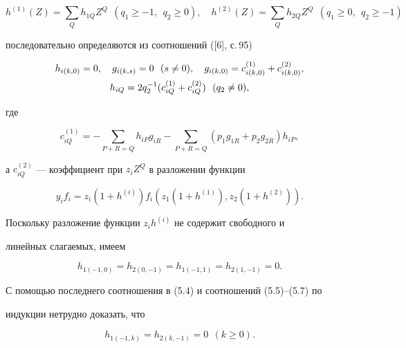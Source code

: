 $$ 


h^{(1)}(Z)=\sum_Q h_{1Q}Z^Q\ \ (q_1\ge-1,\ \ q_2\ge0),\quad 


h^{(2)}(Z)=\sum_Q h_{2Q}Z^Q\ \ (q_1\ge0,\ \ q_2\ge-1) 


$$ 


последовательно определяются из соотношений ([6], с.\,95) 


\begin{gather} 


h_{i(k,0)}=0,\quad g_{i(k,s)}=0\ \ (s\ne0),\quad 


g_{i(k,0)}=c^{(1)}_{i(k,0)}+c^{(2)}_{i(k,0)},\\ 


h_{iQ}=2q^{-1}_2(c^{(1)}_{iQ}+c^{(2)}_{iQ})\ \ (q_2\ne0),\notag 


\end{gather} 


где 


\begin{equation} 


c^{(1)}_{iQ}=-\sum_{P+R=Q}h_{iP}g_{iR}-\sum_{P+R=Q} 


(p_1g_{1R}+p_2g_{2R})h_{iP}, 


\end{equation} 


а $c^{(2)}_{iQ}$ --- коэффициент при $z_i Z^Q$ в разложении функции 


\begin{equation} 


y_i f_i=z_i(1+h^{(i)})f_i(z_1(1+h^{(1)}), 


z_2(1+h^{(2)})). 


\end{equation} 


Поскольку разложение функции $z_i h^{(i)}$ не содержит свободного и 


линейных слагаемых, имеем 


\begin{equation} 


h_{1(-1,0)}=h_{2(0,-1)}=h_{1(-1,1)}=h_{2(1,-1)}=0. 


\end{equation} 


С помощью последнего соотношения в (5.4) и соотношений (5.5)--(5.7) по 


индукции нетрудно доказать, что 


\begin{equation} 


h_{1(-1,k)}=h_{2(k,-1)}=0\ \ (k\ge0). 


\end{equation} 


